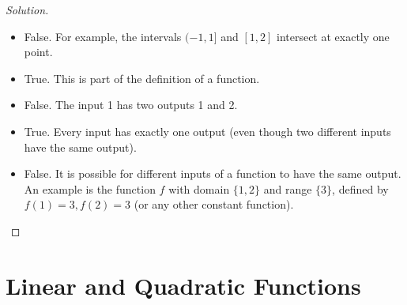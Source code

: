 \documentclass[12pt]{article}
\newenvironment{solution}{\begin{proof}[Solution]}{\end{proof}}
\begin{document}
\begin{enumerate}
		\begin{solution}
			\begin{itemize}
				\item[(a)] 	False. For example, the intervals $(-1,1]$ and $[1,2]$ intersect at exactly one point.
				\item[(b)] 	True. This is part of the definition of a function.
				\item[(c)] False. The input 1 has two outputs 1 and 2.
				\item[(d)] 	True. Every input has exactly one output (even though two different inputs have the same output).
				\item[(e)] False. It is possible for different inputs of a function to have the same output. An example is the function $f$ with domain $\{1,2\}$ and range $\{3\}$, defined by $f(1)=3,f(2)=3$ (or any other constant function).
			\end{itemize}
		\end{solution}
	\end{enumerate}
	
	\newpage
	\section{Linear and Quadratic Functions}
	
\end{document}
